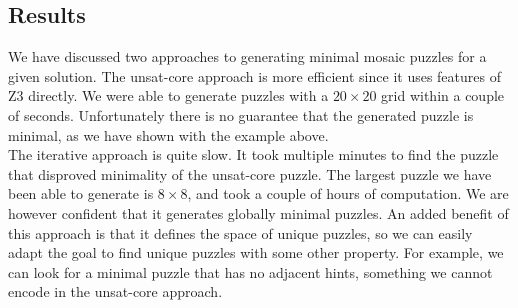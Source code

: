 \documentclass{scrartcl}
\begin{document}
	\subsection{Results} %
	\label{sub:results}
	We have discussed two approaches to generating minimal mosaic puzzles for a given solution.
	The unsat-core approach is more efficient since it uses features of Z3 directly. We were able to generate puzzles with a $20\times20$ grid within a couple of seconds. Unfortunately there is no guarantee that the generated puzzle is minimal, as we have shown with the example above.\\

	The iterative approach is quite slow. It took multiple minutes to find the puzzle that disproved minimality of the unsat-core puzzle. The largest puzzle we have been able to generate is $8\times 8$, and took a couple of hours of computation. We are however confident that it generates globally minimal puzzles. An added benefit of this approach is that it defines the space of unique puzzles, so we can easily adapt the goal to find unique puzzles with some other property. For example, we can look for a minimal puzzle that has no adjacent hints, something we cannot encode in the unsat-core approach.


\appendix
\pagebreak
\end{document}
